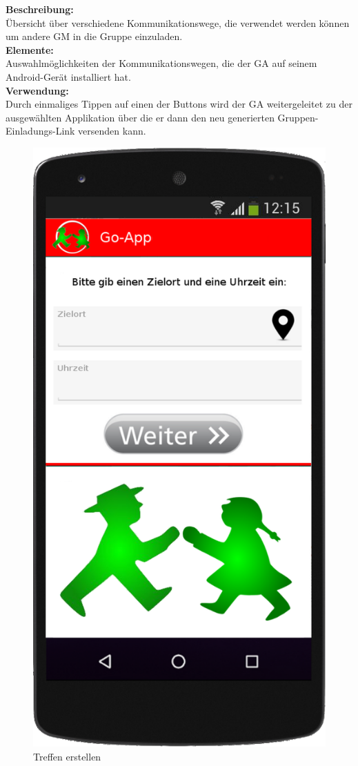 \textbf{Beschreibung:}\\
Übersicht über verschiedene Kommunikationswege, die verwendet werden können um andere GM in die Gruppe einzuladen.\\
\textbf{Elemente:}\\
Auswahlmöglichkeiten der Kommunikationswegen, die der GA auf seinem Android-Gerät installiert hat.\\
\textbf{Verwendung:}\\
Durch einmaliges Tippen auf einen der Buttons wird der GA weitergeleitet zu der ausgewählten Applikation über die er dann den neu generierten Gruppen-Einladungs-Link versenden kann.
\newpage

\begin{figure}
	\caption{Treffen erstellen}
	\includegraphics[scale =0.2]{resources/images/handy/treffpunkt_erstellen.png}

\end{figure}
